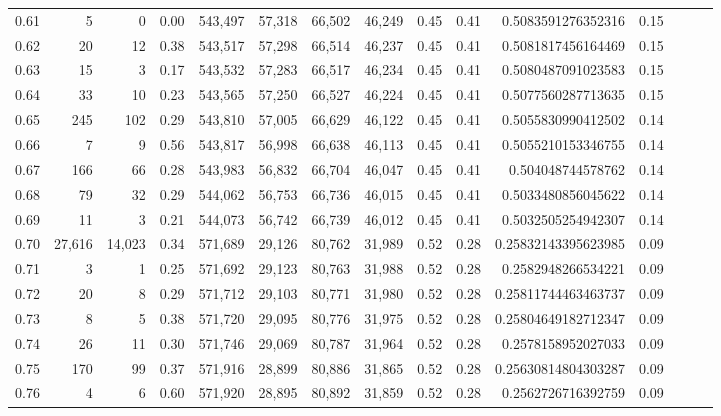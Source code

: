 \begin{tabular}{rrrrrrrrrrrrrrr}
0.61 &       5 &       0 &  0.00 &  543,497 &   57,318 &   66,502 &   46,249 &  0.45 &  0.41 &    0.5083591276352316 &      0.15 \\
0.62 &      20 &      12 &  0.38 &  543,517 &   57,298 &   66,514 &   46,237 &  0.45 &  0.41 &    0.5081817456164469 &      0.15 \\
0.63 &      15 &       3 &  0.17 &  543,532 &   57,283 &   66,517 &   46,234 &  0.45 &  0.41 &    0.5080487091023583 &      0.15 \\
0.64 &      33 &      10 &  0.23 &  543,565 &   57,250 &   66,527 &   46,224 &  0.45 &  0.41 &    0.5077560287713635 &      0.15 \\
0.65 &     245 &     102 &  0.29 &  543,810 &   57,005 &   66,629 &   46,122 &  0.45 &  0.41 &    0.5055830990412502 &      0.14 \\
0.66 &       7 &       9 &  0.56 &  543,817 &   56,998 &   66,638 &   46,113 &  0.45 &  0.41 &    0.5055210153346755 &      0.14 \\
0.67 &     166 &      66 &  0.28 &  543,983 &   56,832 &   66,704 &   46,047 &  0.45 &  0.41 &     0.504048744578762 &      0.14 \\
0.68 &      79 &      32 &  0.29 &  544,062 &   56,753 &   66,736 &   46,015 &  0.45 &  0.41 &    0.5033480856045622 &      0.14 \\
0.69 &      11 &       3 &  0.21 &  544,073 &   56,742 &   66,739 &   46,012 &  0.45 &  0.41 &    0.5032505254942307 &      0.14 \\
0.70 &  27,616 &  14,023 &  0.34 &  571,689 &   29,126 &   80,762 &   31,989 &  0.52 &  0.28 &   0.25832143395623985 &      0.09 \\
0.71 &       3 &       1 &  0.25 &  571,692 &   29,123 &   80,763 &   31,988 &  0.52 &  0.28 &    0.2582948266534221 &      0.09 \\
0.72 &      20 &       8 &  0.29 &  571,712 &   29,103 &   80,771 &   31,980 &  0.52 &  0.28 &   0.25811744463463737 &      0.09 \\
0.73 &       8 &       5 &  0.38 &  571,720 &   29,095 &   80,776 &   31,975 &  0.52 &  0.28 &   0.25804649182712347 &      0.09 \\
0.74 &      26 &      11 &  0.30 &  571,746 &   29,069 &   80,787 &   31,964 &  0.52 &  0.28 &    0.2578158952027033 &      0.09 \\
0.75 &     170 &      99 &  0.37 &  571,916 &   28,899 &   80,886 &   31,865 &  0.52 &  0.28 &   0.25630814804303287 &      0.09 \\
0.76 &       4 &       6 &  0.60 &  571,920 &   28,895 &   80,892 &   31,859 &  0.52 &  0.28 &    0.2562726716392759 &      0.09 \\

\end{tabular}
